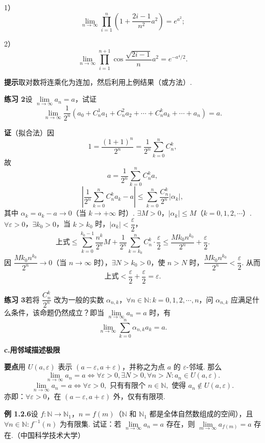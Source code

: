 \documentclass[UTF8,12pt,a4paper,fontset=fandol]{ctexart}
\begin{document}
1）
\[
  \lim_{n\to\infty}\prod_{i=1}^n\left(1+\frac{2i-1}{n^2}a^2\right)=e^{a^2};
\]

2）
\[
  \lim_{n\to\infty}\prod_{i=1}^{n+1}\cos\frac{\sqrt{2i-1}}{n}a^2=e^{-a^4/2}.
\]

\noindent\textbf{提示}\quad 取对数将连乘化为连加，然后利用上例结果（或方法）.

\noindent\textbf{练习 2}\quad 设 $\lim\limits_{n\to\infty}a_n=a$，试证
\[
  \lim_{n\to\infty}\frac1{2^n}\left(a_0+C_n^1a_1+C_n^2a_2+\cdots+C_n^ka_k+\cdots+a_n\right)=a.
\]

\noindent\textbf{证}\quad （拟合法）因
\[
  1=\frac{(1+1)^n}{2^n}=\frac1{2^n}\sum_{k=0}^n C_n^k,
\]
故
\[
  a=\frac1{2^n}\sum_{k=0}^n C_n^k a,
\]
\[
  \left|\frac1{2^n}\sum_{k=0}^n C_n^ka_k-a\right|
  \le \sum_{k=0}^n\frac{C_n^k}{2^n}|\alpha_k|,
\]
其中 $\alpha_k=a_k-a\to0$（当 $k\to+\infty$ 时）. $\exists M>0$，$|\alpha_k|\le M$（$k=0,1,2,\cdots$）. $\forall\varepsilon>0$，$\exists k_0>0$，当 $k>k_0$ 时，$|\alpha_k|<\dfrac\varepsilon2$，
\[
  \text{上式}\le \sum_{k=0}^{k_0-1}\frac{n^k}{2^n}M+\frac1{2^n}\sum_{k=k_0}^n C_n^k\cdot\frac\varepsilon2
  \le \frac{Mk_0n^{k_0}}{2^n}+\frac\varepsilon2.
\]
因 $\dfrac{Mk_0n^{k_0}}{2^n}\to0$（当 $n\to\infty$ 时），$\exists N>k_0>0$，使 $n>N$ 时，$\dfrac{Mk_0n^{k_0}}{2^n}<\dfrac\varepsilon2$. 从而
\[
  \text{上式}<\frac\varepsilon2+\frac\varepsilon2=\varepsilon.
\]

\noindent\textbf{练习 3}\quad 若将 $\dfrac{C_n^k}{2^n}$ 改为一般的实数 $\alpha_{n,k}$，$\forall n\in\mathbb{N}:k=0,1,2,\cdots,n$，问 $\alpha_{n,k}$ 应满足什么条件，该命题仍然成立？即当 $\lim\limits_{n\to\infty}a_n=a$ 时，有
\[
  \lim_{n\to\infty}\sum_{k=0}^n\alpha_{n,k}a_k=a.
\]

\noindent\textbf{c.\quad 用邻域描述极限}

\noindent\textbf{要点}\quad 用 $U(a,\varepsilon)$ 表示 $(a-\varepsilon,a+\varepsilon)$，并称之为点 $a$ 的 $\varepsilon$-邻域. 那么
\[
  \lim_{n\to\infty}a_n=a\Leftrightarrow
  \forall\varepsilon>0,\exists N>0,\forall n>N:a_n\in U(a,\varepsilon).
\tag{A}
\]
\[
  \lim_{n\to\infty}a_n=a\Leftrightarrow
  \forall\varepsilon>0,\text{ 只有有限个 }n\in\mathbb{N},\text{ 使得 }a_n\notin U(a,\varepsilon).
\tag{B}
\]
亦即：$\forall\varepsilon>0$，在 $(a-\varepsilon,a+\varepsilon)$ 外，仅有有限项.

\noindent\textbf{例 1.2.6}\quad 设 $f:\mathbb{N}\to\mathbb{N}_1$，$n=f(m)$（$\mathbb{N}$ 和 $\mathbb{N}_1$ 都是全体自然数组成的空间），且 $\forall n\in\mathbb{N}:f^{-1}(n)$ 为有限集. 试证：若 $\lim\limits_{n\to\infty}a_n=a$ 存在，则 $\lim\limits_{m\to\infty}a_{f(m)}=a$ 存在.（中国科学技术大学）
\end{document}

